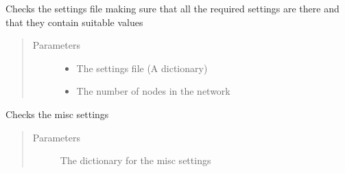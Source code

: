 \documentclass[letterpaper,10pt,english]{sphinxmanual}
\begin{document}
\begin{fulllineitems}
\label{\detokenize{source/yawning_titan.envs.generic.helpers:yawning_titan.envs.generic.helpers.environment_input_validation.check_input}}
\sphinxAtStartPar
Checks the settings file making sure that all the required settings are there and that they contain suitable values
\begin{quote}\begin{description}
\item[{Parameters}] \leavevmode\begin{itemize}
\item {}
\sphinxAtStartPar
{} \textendash{} The settings file (A dictionary)

\item {}
\sphinxAtStartPar
{} \textendash{} The number of nodes in the network

\end{itemize}

\end{description}\end{quote}

\end{fulllineitems}


\begin{fulllineitems}
\label{\detokenize{source/yawning_titan.envs.generic.helpers:yawning_titan.envs.generic.helpers.environment_input_validation.check_misc}}
\sphinxAtStartPar
Checks the misc settings
\begin{quote}\begin{description}
\item[{Parameters}] \leavevmode
\sphinxAtStartPar
{} \textendash{} The dictionary for the misc settings

\end{description}\end{quote}

\end{fulllineitems}
\end{document}
